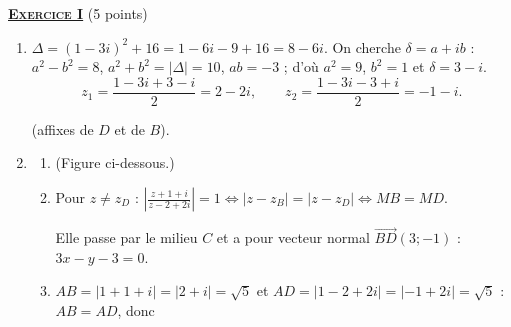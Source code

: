 \providecommand{\Plan}{(\mathscr{P})}
\providecommand{\Ouv}{(O ; \vec{u} , \vec{v})}
\providecommand{\Courbe}{(\mathscr{C})}
\providecommand{\cm}{~\mathrm{cm}}
\providecommand{\dx}{~\mathrm{d}x}
%
\noindent \underline{\textsc{\textbf{Exercice I}}} (5 points)
\begin{enumerate}
   \item {}
      $\Delta = (1 - 3i)^2 + 16 = 1 - 6i - 9 + 16 = 8 - 6i$. On cherche $\delta = a + ib$ : $a^2 - b^2 = 8$,
      $a^2 + b^2 = |\Delta| = 10$, $ab = -3$ ; d'o\`u $a^2 = 9$, $b^2 = 1$ et $\delta = 3 - i$.
      \[
         z_1 = \frac{1 - 3i + 3 - i}{2} = 2 - 2i, \qquad z_2 = \frac{1 - 3i - 3 + i}{2} = -1 - i.
      \]
      \par\noindent{} (affixes de $D$ et de $B$).
   \item
      \begin{enumerate}
         \item {}
            \par\noindent{} (Figure ci-dessous.)
         \item {}
            Pour $z \neq z_D$ : $\left|\frac{z + 1 + i}{z - 2 + 2i}\right| = 1 \iff |z - z_B| = |z - z_D| \iff MB = MD$.
            \par\noindent{}
            Elle passe par le milieu $C$ et a pour vecteur normal $\overrightarrow{BD}(3 ; -1)$ : $3x - y - 3 = 0$.
         \item {}
            $AB = |1 + 1 + i| = |2 + i| = \sqrt{5}$ et $AD = |1 - 2 + 2i| = |-1 + 2i| = \sqrt{5}$ : $AB = AD$, donc
            \par\noindent{}
            \begin{center}
\end{center}
\end{enumerate}
\end{enumerate}
